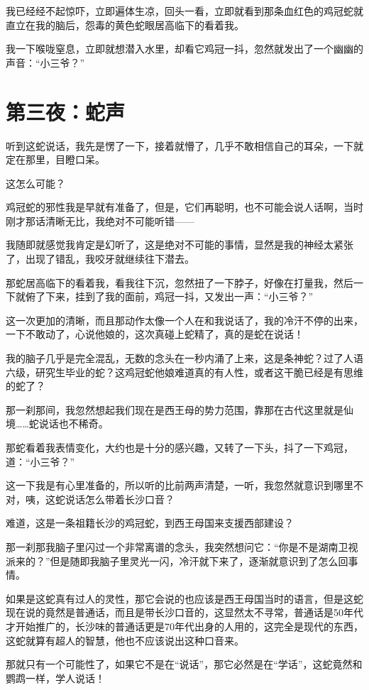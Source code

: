 我已经经不起惊吓，立即遍体生凉，回头一看，立即就看到那条血红色的鸡冠蛇就直立在我的脑后，怨毒的黄色蛇眼居高临下的看着我。

我一下喉咙窒息，立即就想潜入水里，却看它鸡冠一抖，忽然就发出了一个幽幽的声音：“小三爷？”

\chapter{第三夜：蛇声}

听到这蛇说话，我先是愣了一下，接着就懵了，几乎不敢相信自己的耳朵，一下就定在那里，目瞪口呆。

这怎么可能？

鸡冠蛇的邪性我是早就有准备了，但是，它们再聪明，也不可能会说人话啊，当时刚才那话清晰无比，我绝对不可能听错——

我随即就感觉我肯定是幻听了，这是绝对不可能的事情，显然是我的神经太紧张了，出现了错乱，我咬牙就继续往下潜去。

那蛇居高临下的看着我，看我往下沉，忽然扭了一下脖子，好像在打量我，然后一下就俯了下来，挂到了我的面前，鸡冠一抖，又发出一声：“小三爷？”

这一次更加的清晰，而且那动作太像一个人在和我说话了，我的冷汗不停的出来，一下不敢动了，心说他娘的，这次真碰上蛇精了，真的是蛇在说话！

我的脑子几乎是完全混乱，无数的念头在一秒内涌了上来，这是条神蛇？过了人语六级，研究生毕业的蛇？这鸡冠蛇他娘难道真的有人性，或者这干脆已经是有思维的蛇了？

那一刹那间，我忽然想起我们现在是西王母的势力范围，靠那在古代这里就是仙境……蛇说话也不稀奇。

那蛇看着我表情变化，大约也是十分的感兴趣，又转了一下头，抖了一下鸡冠，道：“小三爷？”

这一下我是有心里准备的，所以听的比前两声清楚，一听，我忽然就意识到哪里不对，咦，这蛇说话怎么带着长沙口音？

难道，这是一条祖籍长沙的鸡冠蛇，到西王母国来支援西部建设？

那一刹那我脑子里闪过一个非常离谱的念头，我突然想问它：“你是不是湖南卫视派来的？”但是随即我脑子里灵光一闪，冷汗就下来了，逐渐就意识到了怎么回事情。

如果是这蛇真有过人的灵性，那它会说的也应该是西王母国当时的语言，但是这蛇现在说的竟然是普通话，而且是带长沙口音的，这显然太不寻常，普通话是50年代才开始推广的，长沙味的普通话更是70年代出身的人用的，这完全是现代的东西，这蛇就算有超人的智慧，他也不应该说出这种口音来。

那就只有一个可能性了，如果它不是在“说话”，那它必然是在“学话”，这蛇竟然和鹦鹉一样，学人说话！

